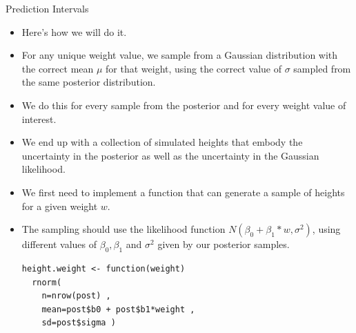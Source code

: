 \documentclass[handout]{beamer}
\begin{document}
\begin{frame}[fragile]{Prediction Intervals}
\scriptsize{
\begin{itemize}


\item Here's how we will do it. 

\item For any unique weight value, we sample from a Gaussian distribution with the correct mean $\mu$ for that weight, using the correct value of $\sigma$ sampled from the same posterior distribution.
\item We do this for every sample from the posterior and for every weight value of interest.

\item We end up with a collection of simulated heights that embody the uncertainty in the posterior as well as the uncertainty in the Gaussian likelihood.

\item We first need to implement a function that can generate a sample of heights for a given weight $w$.

\item The sampling should use the likelihood function $N(\beta_0+\beta_1*w,\sigma^2)$, using different values of  $\beta_0, \beta_1$ and $\sigma^2$ given by our posterior samples.

\begin{verbatim}
height.weight <- function(weight) 
  rnorm(
    n=nrow(post) ,
    mean=post$b0 + post$b1*weight ,
    sd=post$sigma )
\end{verbatim}



\end{itemize}
 

 
}
\end{frame}
\end{document}

